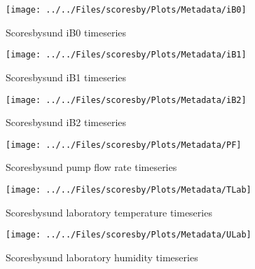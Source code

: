     \begin{figure}
        \centering
\texttt{[image: ../../Files/scoresby/Plots/Metadata/iB0]}
    \caption{Scoresbysund iB0 timeseries}
            \label{fig:iB0}
    \end{figure}

    \begin{figure}
        \centering
\texttt{[image: ../../Files/scoresby/Plots/Metadata/iB1]}
    \caption{Scoresbysund iB1 timeseries}
            \label{fig:iB1}
    \end{figure}

    \begin{figure}
        \centering
\texttt{[image: ../../Files/scoresby/Plots/Metadata/iB2]}
    \caption{Scoresbysund iB2 timeseries}
            \label{fig:iB2}
    \end{figure}

    \begin{figure}
        \centering
\texttt{[image: ../../Files/scoresby/Plots/Metadata/PF]}
    \caption{Scoresbysund pump flow rate timeseries}
            \label{fig:PF}
    \end{figure}



           \begin{figure}
        \centering
\texttt{[image: ../../Files/scoresby/Plots/Metadata/TLab]}
    \caption{Scoresbysund laboratory temperature timeseries}
            \label{fig:TLab}
    \end{figure}

               \begin{figure}
        \centering
\texttt{[image: ../../Files/scoresby/Plots/Metadata/ULab]}
    \caption{Scoresbysund laboratory humidity timeseries}
            \label{fig:ULab}
    \end{figure}

